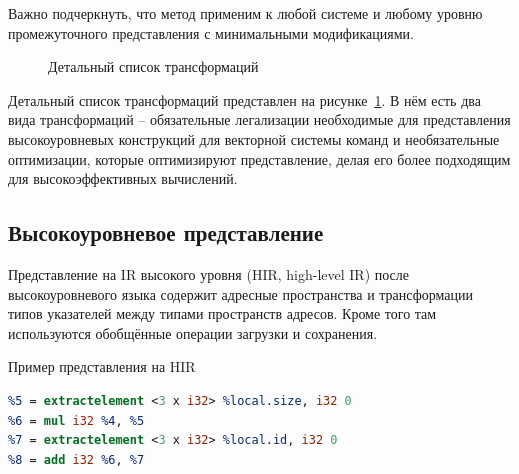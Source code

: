 Важно подчеркнуть, что метод применим к любой системе и любому уровню промежуточного представления с минимальными модификациями. 

\begin{figure}[ht]
    \caption{Детальный список трансформаций}\label{fig:passmgr}
\end{figure}

Детальный список трансформаций представлен на рисунке~\cref{fig:passmgr}. В нём есть два вида трансформаций -- обязательные легализации необходимые для представления высокоуровневых конструкций для векторной системы команд и необязательные оптимизации, которые оптимизируют представление, делая его более подходящим для высокоэффективных вычислений.

\subsection{Высокоуровневое представление}\label{subsec:lowering/passes/highlevel}

Представление на IR высокого уровня (HIR, high-level IR) после высокоуровневого языка содержит адресные пространства и трансформации типов указателей между типами пространств адресов. Кроме того там используются обобщённые операции загрузки и сохранения.

\begin{ListingEnv}[!h]
    \captiondelim{ }
    \caption{Пример представления на HIR}\label{lst:lowering/irrep}
    \begin{lstlisting}[language=llvm]
%4 = tail call i32 @llvm.genx.group.id.x()
%5 = extractelement <3 x i32> %local.size, i32 0
%6 = mul i32 %4, %5
%7 = extractelement <3 x i32> %local.id, i32 0
%8 = add i32 %6, %7
    \end{lstlisting}
\end{ListingEnv}

